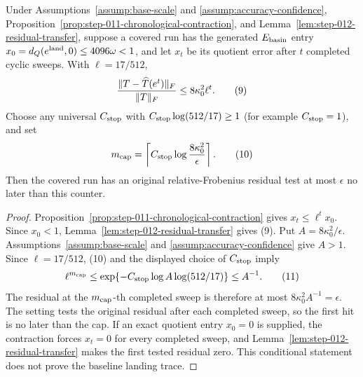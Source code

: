 \begin{proposition}\label{prop:step-012-stop-cap}
Under Assumptions~\ref{assump:base-scale} and
\ref{assump:accuracy-confidence}, Proposition~\ref{prop:step-011-chronological-contraction}, and
Lemma~\ref{lem:step-012-residual-transfer}, suppose a covered run has the
generated \(E_{\rm basin}\) entry
\(x_0=d_Q(e^{\rm land},0)\le4096\omega<1\), and let \(x_t\) be its quotient
error after \(t\) completed cyclic sweeps. With \(\ell=17/512\),
\[
 { \|T-\widehat T(e^t)\|_F\over\|T\|_F}
 \le8\kappa_0^2\ell^t.
\tag{9}
\]
Choose any universal \(C_{\rm stop}\) with
\(C_{\rm stop}\log(512/17)\ge1\) (for example \(C_{\rm stop}=1\)), and set
\[
 m_{\rm cap}=\left\lceil C_{\rm stop}\log{8\kappa_0^2\over\epsilon}\right\rceil.
\tag{10}
\]
Then the covered run has an original relative-Frobenius residual test at most
\(\epsilon\) no later than this counter.

\begin{proof}
Proposition~\ref{prop:step-011-chronological-contraction} gives
\(x_t\le\ell^t x_0\). Since \(x_0<1\),
Lemma~\ref{lem:step-012-residual-transfer} gives (9). Put
\(A=8\kappa_0^2/\epsilon\). Assumptions~\ref{assump:base-scale} and
\ref{assump:accuracy-confidence} give \(A>1\). Since \(\ell=17/512\),
(10) and the displayed choice of \(C_{\rm stop}\) imply
\[
 \ell^{m_{\rm cap}}
 \le\exp\{-C_{\rm stop}\log A\log(512/17)\}\le A^{-1}.
\tag{11}
\]
The residual at the \(m_{\rm cap}\)-th completed sweep is therefore at most
\(8\kappa_0^2A^{-1}=\epsilon\). The setting tests the original residual after
each completed sweep, so the first hit is no later than the cap. If an exact
quotient entry \(x_0=0\) is supplied, the contraction forces
\(x_t=0\) for every completed sweep, and
Lemma~\ref{lem:step-012-residual-transfer} makes the first tested residual
zero. This conditional statement does not prove the baseline landing trace.



\end{proof}
\end{proposition}
